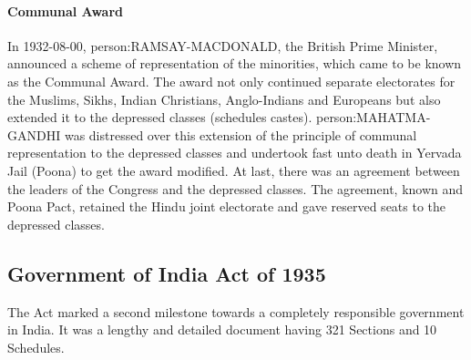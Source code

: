 \paragraph{Communal Award}
In 1932-08-00, \gls{person:RAMSAY-MACDONALD}, the British Prime Minister, announced a scheme of representation of the minorities, which came to be known as the Communal Award. The award not only continued separate electorates for the Muslims, Sikhs, Indian Christians, Anglo-Indians and Europeans but also extended it to the depressed classes (schedules castes). \gls{person:MAHATMA-GANDHI} was distressed over this extension of the principle of communal representation to the depressed classes and undertook fast unto death in Yervada Jail (Poona) to get the award modified. At last, there was an agreement between the leaders of the Congress and the depressed classes. The agreement, known and Poona Pact, retained the Hindu joint electorate and gave reserved seats to the depressed classes.



\subsection{Government of India Act of 1935}

The Act marked a second milestone towards a completely responsible government in India. It was a lengthy and detailed document having 321 Sections and 10 Schedules.

